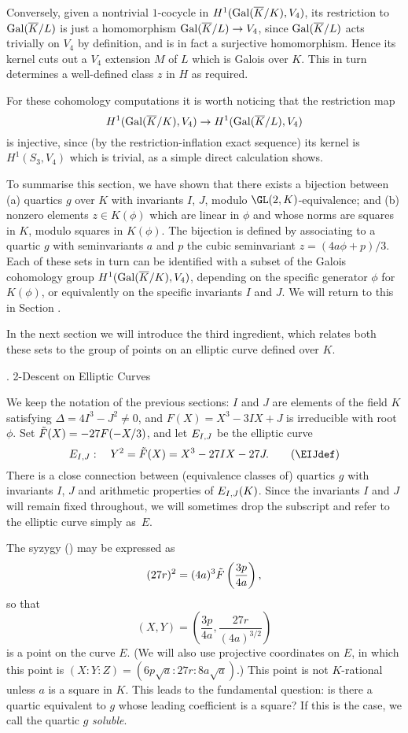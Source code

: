 Conversely, given a nontrivial $1$-cocycle in
$H^1(\operatorname{Gal}(\overline{K}/K),V_4)$, its restriction to $\operatorname{Gal}(\overline{K}/L)$ is just a
homomorphism $\operatorname{Gal}(\overline{K}/L)\to V_4$, since $\operatorname{Gal}(\overline{K}/L)$ acts
trivially on $V_4$ by definition, and is in fact a surjective
homomorphism.  Hence its kernel cuts out a $V_4$ extension $M$ of $L$
which is Galois over $K$.  This in turn determines a well-defined
class $z$ in $H$ as required.

For these cohomology computations it is worth noticing that the
restriction map
$$
H^1(\operatorname{Gal}(\overline{K}/K),V_4) \to H^1(\operatorname{Gal}(\overline{K}/L),V_4)
$$
is injective, since (by the restriction-inflation exact sequence) its
kernel is $H^1(S_3,V_4)$ which is trivial, as a
simple direct calculation shows.

\medskip

To summarise this section, we have shown that there exists a bijection
between (a) quartics $g$ over $K$ with invariants $I$, $J$, modulo
$\GL(2,K)$-equivalence; and (b) nonzero elements $z\in K(\phi)$ which
are linear in $\phi$ and whose norms are squares in $K$, modulo
squares in $K(\phi)$.  The bijection is defined by associating to a
quartic $g$ with seminvariants $a$ and $p$ the cubic seminvariant $z
=(4a\phi+p)/3$.  Each of these sets in turn can be identified with a
subset of the Galois cohomology group $H^1(\operatorname{Gal}(\overline{K}/K),V_4)$,
depending on the specific generator $\phi$ for $K(\phi)$, or
equivalently on the specific invariants $I$ and $J$.  We will return
to this in Section \GStructure.

In the next section we will introduce the third ingredient, which
relates both these sets to the group of points on an elliptic curve
defined over $K$.


\beginsection{\Descent}
\head\Descent. 2-Descent on Elliptic Curves \endhead

We keep the notation of the previous sections: $I$ and $J$ are
elements of the field $K$ satisfying $\Delta=4I^3-J^2\not=0$, and
$F(X)=X^3-3IX+J$ is irreducible with root $\phi$.  Set
$\tilde{F}(X)=-27F(-X/3)$, and let $E_{I,J}$ be the elliptic curve
\neweq\EIJdef
$$
   \EIJ:\quad Y^2 = \Ft(X) = X^3 -27IX-27J. \tag\EIJdef
$$
There is a close connection between (equivalence classes of) quartics
$g$ with invariants $I$, $J$ and arithmetic properties of $E_{I,J}(K)$.
Since the invariants $I$ and $J$ will remain fixed throughout, we will
sometimes drop the subscript and refer to the elliptic curve simply
as~$E$.

The syzygy (\semisyz) may be expressed as 
$$ 
   (27r)^2 = (4a)^3 \tilde{F}\left(\frac{3p}{4a}\right), 
$$ 
so that 
$$
   (X,Y)=\left(\frac{3p}{4a},\frac{27r}{(4a)^{3/2}}\right)
$$ 
is a point on the curve $E$.  (We will also use projective
coordinates on $E$, in which this point is
$(X:Y:Z)=(6p\sqrt{a}:27r:8a\sqrt{a})$.)  This point is not $K$-rational
unless $a$ is a square in $K$.  This leads to the fundamental
question: is there a quartic equivalent to $g$ whose leading
coefficient is a square?  If this is the case, we call the quartic $g$
{\it soluble\/}.  

